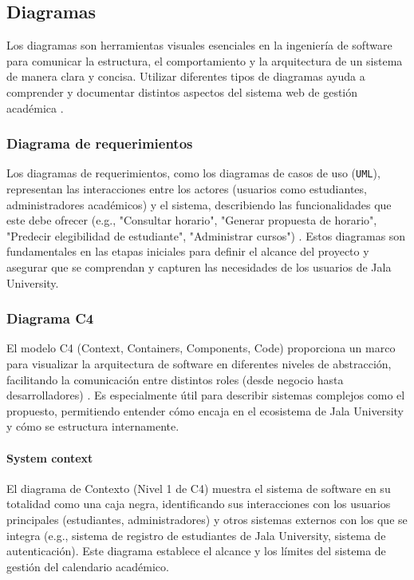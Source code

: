 \subsection{Diagramas}
Los diagramas son herramientas visuales esenciales en la ingeniería de software para comunicar la estructura, el comportamiento y la arquitectura de un sistema de manera clara y concisa.
Utilizar diferentes tipos de diagramas ayuda a comprender y documentar distintos aspectos del sistema web de gestión académica \parencite{Fowler2003}.

\subsubsection{Diagrama de requerimientos}
Los diagramas de requerimientos, como los diagramas de casos de uso (\texttt{UML}), representan las interacciones entre los actores (usuarios como estudiantes, administradores académicos) y el sistema, describiendo las funcionalidades que este debe ofrecer (e.g., "Consultar horario", "Generar propuesta de horario", "Predecir elegibilidad de estudiante", "Administrar cursos") \parencite{Jacobson1992}.
Estos diagramas son fundamentales en las etapas iniciales para definir el alcance del proyecto y asegurar que se comprendan y capturen las necesidades de los usuarios de Jala University.

\subsubsection{Diagrama C4}
El modelo C4 (Context, Containers, Components, Code) proporciona un marco para visualizar la arquitectura de software en diferentes niveles de abstracción, facilitando la comunicación entre distintos roles (desde negocio hasta desarrolladores) \parencite{BrownC4}.
Es especialmente útil para describir sistemas complejos como el propuesto, permitiendo entender cómo encaja en el ecosistema de Jala University y cómo se estructura internamente.

\paragraph{System context}
El diagrama de Contexto (Nivel 1 de C4) muestra el sistema de software en su totalidad como una caja negra, identificando sus interacciones con los usuarios principales (estudiantes, administradores) y otros sistemas externos con los que se integra (e.g., sistema de registro de estudiantes de Jala University, sistema de autenticación).
Este diagrama establece el alcance y los límites del sistema de gestión del calendario académico.

